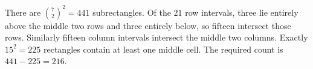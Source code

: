 There are $\binom72^2=441$ subrectangles. Of the $21$ row intervals, three lie entirely above the middle two rows and three entirely below, so fifteen intersect those rows. Similarly fifteen column intervals intersect the middle two columns. Exactly $15^2=225$ rectangles contain at least one middle cell. The required count is $441-225=\boxed{216}$.
